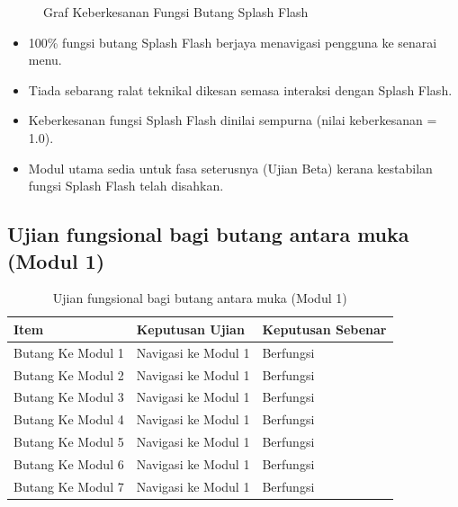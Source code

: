 {{\begin{figure}[h]
\centering
{}
\caption{Graf Keberkesanan Fungsi Butang Splash Flash}
\end{figure}

\begin{itemize}[h]
  \item 100\% fungsi butang Splash Flash berjaya menavigasi pengguna ke senarai menu.  
  \item Tiada sebarang ralat teknikal dikesan semasa interaksi dengan Splash Flash.  
  \item Keberkesanan fungsi Splash Flash dinilai sempurna (nilai keberkesanan = 1.0).  
  \item Modul utama sedia untuk fasa seterusnya (Ujian Beta) kerana kestabilan fungsi Splash Flash telah disahkan.  
\end{itemize}
\clearpage

\subsection{Ujian fungsional bagi butang antara muka (Modul 1)}
\begin{table}[h]
\centering
\caption{Ujian fungsional bagi butang antara muka (Modul 1)}
\label{jadual-5-2}
\begin{tabular}{|l|l|l|}
\hline
\textbf{Item} & \textbf{Keputusan Ujian} & \textbf{Keputusan Sebenar} \\ \hline
Butang Ke Modul 1 & Navigasi ke Modul 1 & Berfungsi \\ \hline
Butang Ke Modul 2 & Navigasi ke Modul 1 & Berfungsi \\ \hline
Butang Ke Modul 3 & Navigasi ke Modul 1 & Berfungsi \\ \hline
Butang Ke Modul 4 & Navigasi ke Modul 1 & Berfungsi \\ \hline
Butang Ke Modul 5 & Navigasi ke Modul 1 & Berfungsi \\ \hline
Butang Ke Modul 6 & Navigasi ke Modul 1 & Berfungsi \\ \hline
Butang Ke Modul 7 & Navigasi ke Modul 1 & Berfungsi \\ \hline
\end{tabular}
\end{table}

}}

